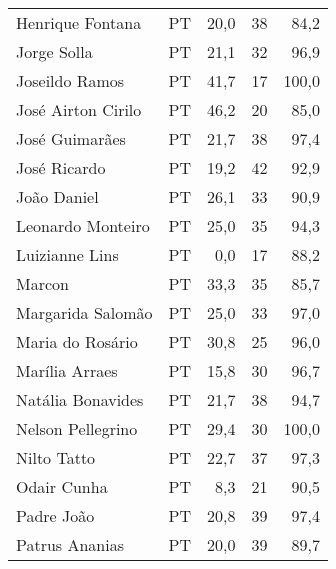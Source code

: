 \begin{longtable}{llrrr}
                    Henrique Fontana &             PT &      20,0 &           38 &       84,2 \\
                         Jorge Solla &             PT &      21,1 &           32 &       96,9 \\
                      Joseildo Ramos &             PT &      41,7 &           17 &      100,0 \\
                  José Airton Cirilo &             PT &      46,2 &           20 &       85,0 \\
                      José Guimarães &             PT &      21,7 &           38 &       97,4 \\
                        José Ricardo &             PT &      19,2 &           42 &       92,9 \\
                         João Daniel &             PT &      26,1 &           33 &       90,9 \\
                   Leonardo Monteiro &             PT &      25,0 &           35 &       94,3 \\
                      Luizianne Lins &             PT &       0,0 &           17 &       88,2 \\
                              Marcon &             PT &      33,3 &           35 &       85,7 \\
                   Margarida Salomão &             PT &      25,0 &           33 &       97,0 \\
                    Maria do Rosário &             PT &      30,8 &           25 &       96,0 \\
                      Marília Arraes &             PT &      15,8 &           30 &       96,7 \\
                   Natália Bonavides &             PT &      21,7 &           38 &       94,7 \\
                   Nelson Pellegrino &             PT &      29,4 &           30 &      100,0 \\
                         Nilto Tatto &             PT &      22,7 &           37 &       97,3 \\
                         Odair Cunha &             PT &       8,3 &           21 &       90,5 \\
                          Padre João &             PT &      20,8 &           39 &       97,4 \\
                      Patrus Ananias &             PT &      20,0 &           39 &       89,7 \\

\end{longtable}
